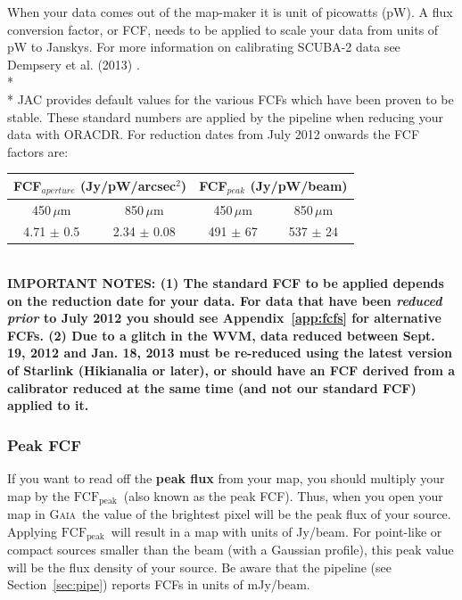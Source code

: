 \documentclass[twoside,11pt]{article}
\newcommand{\htmlref}[2]{#1}
\newcommand{\latexhtml}[2]{#1}
\newcommand{\xref}[3]{#1}
\renewcommand{\_}{\texttt{\symbol{95}}}
\newcommand{\fcfb}{$\mathrm{FCF_{peak}}$}
\newcommand{\gaia}{\xref{\textsc{Gaia}}{sun214}{}}
\newcommand{\cref}[3]{\latexhtml{#1~\ref{#2}}{\htmlref{#3}{#2}}}
\begin{document}
When your data comes out of the map-maker it is unit of picowatts
(pW). A flux conversion factor, or FCF, needs to be applied to scale
your data from units of pW to Janskys. For more information on calibrating
SCUBA-2 data see Dempsery et al. (2013) \cite{dempsey12}.
\\*\\*
JAC provides default values for the various FCFs which have been proven
to be stable. These standard numbers are applied by the pipeline when
reducing your data with ORAC\_DR. For reduction dates from July 2012
onwards the FCF factors are:
\begin{table}[h!]
\centering
\begin{tabular}{|c|c|c|c|}
\hline
\multicolumn{2}{|c|}{FCF$_{aperture}$ (Jy/pW/arcsec$^2$) } &
\multicolumn{2}{c|}{FCF$_{peak}$ (Jy/pW/beam)} \\
\hline
\hspace{0.4cm} 450\,$\mu$m \hspace{0.3cm} & 850\,$\mu$m & \hspace{0.4cm} 450\,$\mu$m \hspace{0.3cm}& 850\,$\mu$m \\
\hline
4.71 $\pm$ 0.5& 2.34 $\pm$ 0.08& 491 $\pm$ 67& 537 $\pm$ 24 \\
\hline
\end{tabular}
\end{table}
\\
\textbf{IMPORTANT NOTES: (1) The standard FCF to be applied depends on
the reduction date for your data. For data that have been
\emph{reduced prior} to July 2012 you should see
\cref{Appendix}{app:fcfs}{FCFs by Reduction Date} for alternative
FCFs. (2) Due to a glitch in the WVM, data reduced between Sept. 19,
2012 and Jan. 18, 2013 must be re-reduced using the latest version of
Starlink (Hikianalia or later), or should have an FCF derived from a
calibrator reduced at the same time (and not our standard FCF) applied
to it. }

\subsubsection{Peak FCF}

If you want to read off the \textbf{peak flux} from your map, you
should multiply your map by the \fcfb\ (also known as the peak FCF).
Thus, when you open your map in \gaia\ the value of the brightest
pixel will be the peak flux of your source. Applying \fcfb\ will
result in a map with units of Jy/beam. For point-like or compact
sources smaller than the beam (with a Gaussian profile), this peak
value will be the flux density of your source. Be aware that the
pipeline (see \cref{Section}{sec:pipe}{SCUBA-2 Pipeline}) reports FCFs
in units of mJy/beam.
\end{document}
